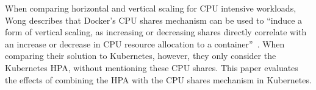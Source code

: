 When comparing horizontal and vertical scaling for CPU intensive workloads, Wong describes that Docker's CPU shares mechanism can be used to ``induce a form of vertical scaling, as increasing or decreasing shares directly correlate with an increase or decrease in CPU resource allocation to a container''~\citep{hyscale}. When comparing their solution to Kubernetes, however, they only consider the Kubernetes HPA, without mentioning these CPU shares. This paper evaluates the effects of combining the HPA with the CPU shares mechanism in Kubernetes. 
